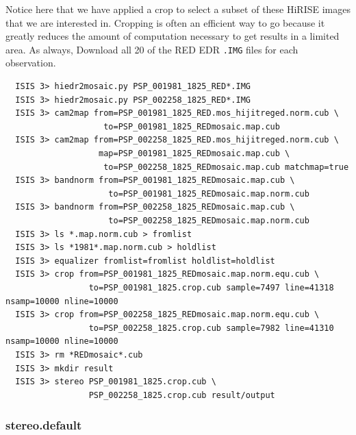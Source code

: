Notice here that we have applied a crop to select a subset of these
HiRISE images that we are interested in.  Cropping is often an
efficient way to go because it greatly reduces the amount of
computation necessary to get results in a limited area.  As always,
Download all 20 of the RED EDR \texttt{.IMG} files for each observation.
\begin{verbatim}
  ISIS 3> hiedr2mosaic.py PSP_001981_1825_RED*.IMG
  ISIS 3> hiedr2mosaic.py PSP_002258_1825_RED*.IMG
  ISIS 3> cam2map from=PSP_001981_1825_RED.mos_hijitreged.norm.cub \
                    to=PSP_001981_1825_REDmosaic.map.cub
  ISIS 3> cam2map from=PSP_002258_1825_RED.mos_hijitreged.norm.cub \
                   map=PSP_001981_1825_REDmosaic.map.cub \
                    to=PSP_002258_1825_REDmosaic.map.cub matchmap=true
  ISIS 3> bandnorm from=PSP_001981_1825_REDmosaic.map.cub \
                     to=PSP_001981_1825_REDmosaic.map.norm.cub
  ISIS 3> bandnorm from=PSP_002258_1825_REDmosaic.map.cub \
                     to=PSP_002258_1825_REDmosaic.map.norm.cub
  ISIS 3> ls *.map.norm.cub > fromlist
  ISIS 3> ls *1981*.map.norm.cub > holdlist
  ISIS 3> equalizer fromlist=fromlist holdlist=holdlist
  ISIS 3> crop from=PSP_001981_1825_REDmosaic.map.norm.equ.cub \
                 to=PSP_001981_1825.crop.cub sample=7497 line=41318 nsamp=10000 nline=10000
  ISIS 3> crop from=PSP_002258_1825_REDmosaic.map.norm.equ.cub \
                 to=PSP_002258_1825.crop.cub sample=7982 line=41310 nsamp=10000 nline=10000
  ISIS 3> rm *REDmosaic*.cub
  ISIS 3> mkdir result
  ISIS 3> stereo PSP_001981_1825.crop.cub \
                 PSP_002258_1825.crop.cub result/output
\end{verbatim}

\subsubsection*{stereo.default}

